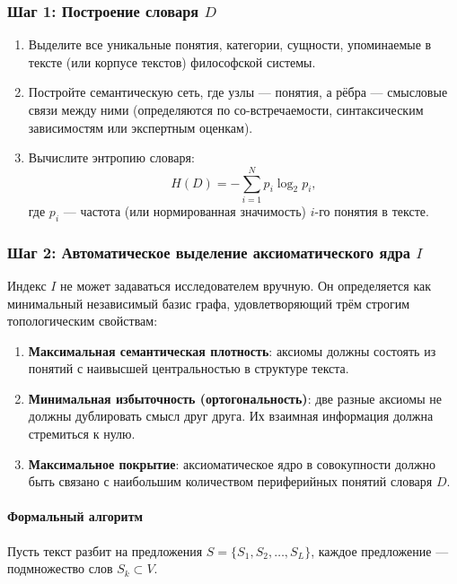 \documentclass[12pt,a4paper]{article}
\begin{document}
	\subsubsection{Шаг 1: Построение словаря \(D\)}
	
	\begin{enumerate}
		\item Выделите все уникальные понятия, категории, сущности, упоминаемые в тексте (или корпусе текстов) философской системы.
		\item Постройте семантическую сеть, где узлы — понятия, а рёбра — смысловые связи между ними (определяются по со-встречаемости, синтаксическим зависимостям или экспертным оценкам).
		\item Вычислите энтропию словаря:
		\[
		H(D) = -\sum_{i=1}^{N} p_i \log_2 p_i,
		\]
		где \(p_i\) — частота (или нормированная значимость) \(i\)-го понятия в тексте.
	\end{enumerate}
	
	\subsubsection{Шаг 2: Автоматическое выделение аксиоматического ядра \(I\)}
	\label{sec:auto-basis}
	
	Индекс \(I\) не может задаваться исследователем вручную. Он определяется как минимальный независимый базис графа, удовлетворяющий трём строгим топологическим свойствам:
	\begin{enumerate}
		\item \textbf{Максимальная семантическая плотность}: аксиомы должны состоять из понятий с наивысшей центральностью в структуре текста.
		\item \textbf{Минимальная избыточность (ортогональность)}: две разные аксиомы не должны дублировать смысл друг друга. Их взаимная информация должна стремиться к нулю.
		\item \textbf{Максимальное покрытие}: аксиоматическое ядро в совокупности должно быть связано с наибольшим количеством периферийных понятий словаря \(D\).
	\end{enumerate}
	
	\paragraph{Формальный алгоритм}
	Пусть текст разбит на предложения \(S = \{S_1, S_2, \dots, S_L\}\), каждое предложение — подмножество слов \(S_k \subset V\).
	
\end{document}
